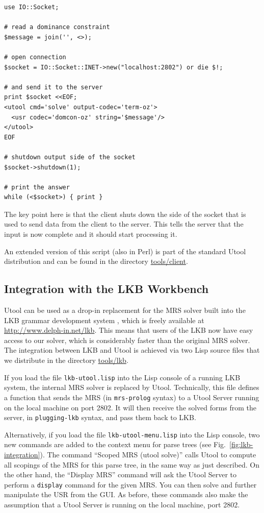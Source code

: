 \begin{verbatim}
use IO::Socket;

# read a dominance constraint
$message = join('', <>);

# open connection
$socket = IO::Socket::INET->new("localhost:2802") or die $!;

# and send it to the server
print $socket <<EOF;
<utool cmd='solve' output-codec='term-oz'>
  <usr codec='domcon-oz' string='$message'/>
</utool>
EOF

# shutdown output side of the socket
$socket->shutdown(1);

# print the answer 
while (<$socket>) { print }
\end{verbatim}

The key point here is that the client shuts down the side of the
socket that is used to send data from the client to the server. This
tells the server that the input is now complete and it should start
processing it.

An extended version of this script (also in Perl) is part of the
standard Utool distribution and can be found in the directory
\url{tools/client}. 




\subsection{Integration with the LKB Workbench}
\label{sec:integration-lkb}


Utool can be used as a drop-in replacement for the MRS solver built
into the LKB grammar development system \cite{Copestake:LKB-Book},
which is freely available at \url{http://www.delph-in.net/lkb}. This means that users of the
LKB now have easy access to our solver, which is considerably faster
than the original MRS solver. The integration between LKB and Utool is
achieved via two Lisp source files that we distribute in the directory
\url{tools/lkb}.

If you load the file \verb|lkb-utool.lisp| into the Lisp console
of a running LKB system, the internal MRS solver is replaced by
Utool. Technically, this file defines a function that sends the MRS
(in \verb?mrs-prolog? syntax) to a Utool Server running on the local
machine on port 2802. It will then receive the solved forms from the
server, in \verb?plugging-lkb? syntax, and pass them back to LKB.

 Alternatively, if you load the file \verb|lkb-utool-menu.lisp|
into the Lisp console, two new commands are added to the context menu
for parse trees (see Fig.~\ref{fig:lkb-integration}). The command
``Scoped MRS (utool solve)'' calls Utool to compute all scopings of
the MRS for this parse tree, in the same way as just described. On the
other hand, the ``Display MRS'' command will ask the Utool Server to
perform a \verb?display? command for the given MRS. You can then solve
and further manipulate the USR from the GUI. As before, these commands
also make the assumption that a Utool Server is running on the local
machine, port 2802.


